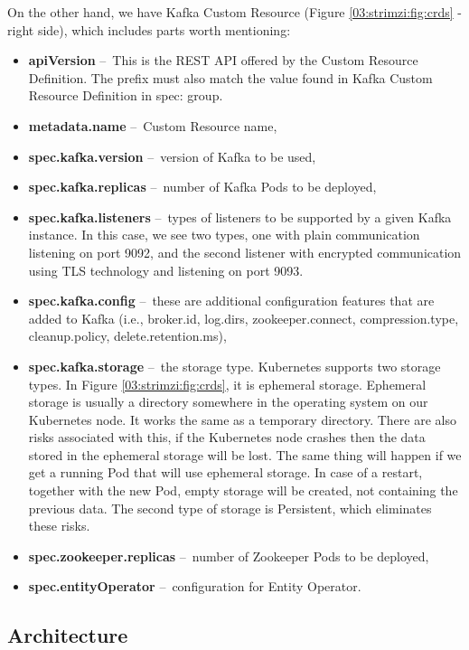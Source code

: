 On the other hand, we have Kafka Custom Resource (Figure \ref{03:strimzi:fig:crds} - right side), which includes parts worth mentioning:
\begin{itemize}[itemsep=1mm, parsep=0pt]
  \item \textbf{apiVersion} \---\ This is the REST API offered by the Custom Resource Definition.
  The prefix must also match the value found in Kafka Custom Resource Definition in spec: group.
  \item \textbf{metadata.name} \---\ Custom Resource name,
  \item \textbf{spec.kafka.version} \---\ version of Kafka to be used,
  \item \textbf{spec.kafka.replicas} \---\ number of Kafka Pods to be deployed,
  \item \textbf{spec.kafka.listeners} \---\ types of listeners to be supported by a given Kafka instance.
  In this case, we see two types, one with plain communication listening on port 9092, and the second listener with encrypted communication using TLS technology and listening on port 9093.
  \item  \textbf{spec.kafka.config} \---\ these are additional configuration features that are added to Kafka (i.e., broker.id, log.dirs, zookeeper.connect, compression.type, cleanup.policy, delete.retention.ms),
  \item  \textbf{spec.kafka.storage} \cite{strimziStorageBlogPost} \---\ the storage type.
  Kubernetes supports two storage types.
  In Figure \ref{03:strimzi:fig:crds}, it is ephemeral storage.
  Ephemeral storage is usually a directory somewhere in the operating system on our Kubernetes node.
  It works the same as a temporary directory.
  There are also risks associated with this, if the Kubernetes node crashes then the data stored in the ephemeral storage will be lost.
  The same thing will happen if we get a running Pod that will use ephemeral storage.
  In case of a restart, together with the new Pod, empty storage will be created, not containing the previous data.
  The second type of storage is Persistent, which eliminates these risks.
  \item \textbf{spec.zookeeper.replicas} \---\ number of Zookeeper Pods to be deployed,
  \item \textbf{spec.entityOperator} \---\ configuration for Entity Operator.
\end{itemize}

\subsection{Architecture}

